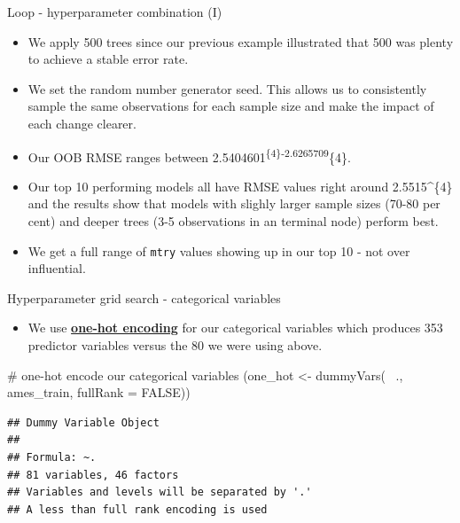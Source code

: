 \documentclass[
  10pt,
  ignorenonframetext,
]{beamer}
\newenvironment{Shaded}{}{}
\newcommand{\CommentTok}[1]{\textcolor[rgb]{0.00,0.50,0.00}{#1}}
\newcommand{\DataTypeTok}[1]{#1}
\newcommand{\KeywordTok}[1]{\textcolor[rgb]{0.00,0.00,1.00}{#1}}
\newcommand{\NormalTok}[1]{#1}
\newcommand{\OperatorTok}[1]{#1}
\newcommand{\OtherTok}[1]{\textcolor[rgb]{1.00,0.25,0.00}{#1}}
\newcommand{\StringTok}[1]{\textcolor[rgb]{0.00,0.50,0.50}{#1}}
\providecommand{\tightlist}{%
  \setlength{\itemsep}{0pt}\setlength{\parskip}{0pt}}
\begin{document}
\begin{frame}[fragile]{Loop - hyperparameter combination (I)}
\protect\hypertarget{loop---hyperparameter-combination-i-1}{}

\begin{itemize}
\tightlist
\item
  We apply 500 trees since our previous example illustrated that 500 was
  plenty to achieve a stable error rate.
\item
  We set the random number generator seed. This allows us to
  consistently sample the same observations for each sample size and
  make the impact of each change clearer.
\item
  Our OOB RMSE ranges between
  2.5404601\textsuperscript{\{4\}-2.6265709}\{4\}.
\item
  Our top 10 performing models all have RMSE values right around
  2.5515\^{}\{4\} and the results show that models with slighly
  larger sample sizes (70-80 per cent) and deeper trees (3-5
  observations in an terminal node) perform best.
\item
  We get a full range of \texttt{mtry} values showing up in our top 10 -
  not over influential. 
\end{itemize}

\end{frame}

\begin{frame}[fragile]{Hyperparameter grid search - categorical
variables}
\protect\hypertarget{hyperparameter-grid-search---categorical-variables}{}

\begin{itemize}
\tightlist
\item
  We use
  \href{https://hackernoon.com/what-is-one-hot-encoding-why-and-when-do-you-have-to-use-it-e3c6186d008f}{\textbf{one-hot
  encoding}} for our categorical variables which produces 353 predictor
  variables versus the 80 we were using above.
\end{itemize}

\begin{Shaded}
\begin{Highlighting}[]
\CommentTok{# one-hot encode our categorical variables}
\NormalTok{(one_hot <-}\StringTok{ }\KeywordTok{dummyVars}\NormalTok{(}\OperatorTok{~}\StringTok{ }\NormalTok{., ames_train, }\DataTypeTok{fullRank =} \OtherTok{FALSE}\NormalTok{))}
\end{Highlighting}
\end{Shaded}

\begin{verbatim}
## Dummy Variable Object
## 
## Formula: ~.
## 81 variables, 46 factors
## Variables and levels will be separated by '.'
## A less than full rank encoding is used
\end{verbatim}

\end{frame}
\end{document}
